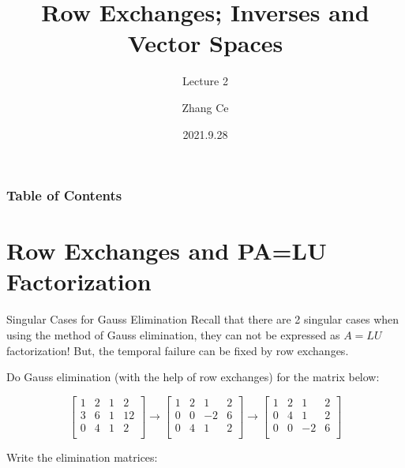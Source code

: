 \documentclass{beamer}
\title[Linear Algebra] %
{Row Exchanges; Inverses and Vector Spaces}
\subtitle{Lecture 2}
\author[11910803@mail.sustech.edu.cn] %
{
    Zhang Ce
}
\institute[] %
{
    Department of Electrical and Electronic Engineering\\
    Southern University of Science and Technology
}
\date[2021.9.28] %
{2021.9.28}
\begin{document}
\frame{\titlepage}


\begin{frame}
\frametitle{Table of Contents}
\tableofcontents
\end{frame}

\section{Row Exchanges and PA=LU Factorization}

\begin{frame}{Singular Cases for Gauss Elimination}
Recall that there are 2 singular cases when using the method of Gauss elimination, they can not be expressed as $A=LU$ factorization! But, the temporal failure can be fixed by row exchanges.

\vspace{3pt}
Do Gauss elimination (with the help of row exchanges) for the matrix below:

\begin{equation*}
    \left[ \begin{matrix}
        1&		2&		1&		2\\
        3&		6&		1&		12\\
        0&		4&		1&		2\\
    \end{matrix} \right] \rightarrow \left[ \begin{matrix}
        1&		2&		1&		2\\
        0&		0&		-2&		6\\
        0&		4&		1&		2\\
    \end{matrix} \right] \rightarrow \left[ \begin{matrix}
        1&		2&		1&		2\\
        0&		4&		1&		2\\
        0&		0&		-2&		6\\
    \end{matrix} \right]
\end{equation*}

Write the elimination matrices:


\end{frame}
\end{document}
